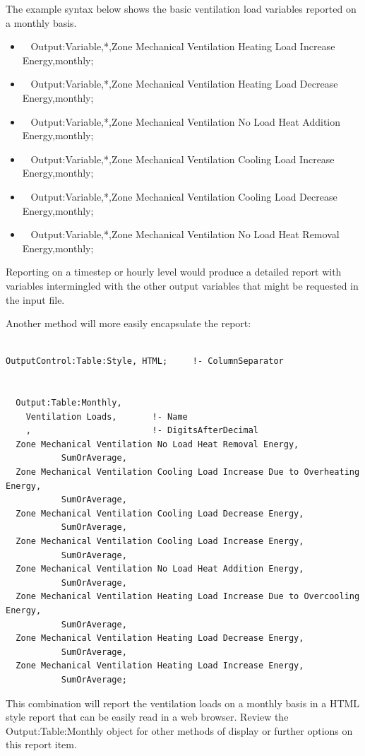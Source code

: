The example syntax below shows the basic ventilation load variables reported on a monthly basis.

\begin{itemize}
\item
  ~ Output:Variable,*,Zone Mechanical Ventilation Heating Load Increase Energy,monthly;
\item
  ~ Output:Variable,*,Zone Mechanical Ventilation Heating Load Decrease Energy,monthly;
\item
  ~ Output:Variable,*,Zone Mechanical Ventilation No Load Heat Addition Energy,monthly;
\item
  ~ Output:Variable,*,Zone Mechanical Ventilation Cooling Load Increase Energy,monthly;
\item
  ~ Output:Variable,*,Zone Mechanical Ventilation Cooling Load Decrease Energy,monthly;
\item
  ~ Output:Variable,*,Zone Mechanical Ventilation No Load Heat Removal Energy,monthly;
\end{itemize}

Reporting on a timestep or hourly level would produce a detailed report with variables intermingled with the other output variables that might be requested in the input file.

Another method will more easily encapsulate the report:

\begin{lstlisting}

OutputControl:Table:Style, HTML;     !- ColumnSeparator


  Output:Table:Monthly,
    Ventilation Loads,       !- Name
    ,                        !- DigitsAfterDecimal
  Zone Mechanical Ventilation No Load Heat Removal Energy,
           SumOrAverage,
  Zone Mechanical Ventilation Cooling Load Increase Due to Overheating Energy,
           SumOrAverage,
  Zone Mechanical Ventilation Cooling Load Decrease Energy,
           SumOrAverage,
  Zone Mechanical Ventilation Cooling Load Increase Energy,
           SumOrAverage,
  Zone Mechanical Ventilation No Load Heat Addition Energy,
           SumOrAverage,
  Zone Mechanical Ventilation Heating Load Increase Due to Overcooling Energy,
           SumOrAverage,
  Zone Mechanical Ventilation Heating Load Decrease Energy,
           SumOrAverage,
  Zone Mechanical Ventilation Heating Load Increase Energy,
           SumOrAverage;
\end{lstlisting}

This combination will report the ventilation loads on a monthly basis in a HTML style report that can be easily read in a web browser. Review the Output:Table:Monthly object for other methods of display or further options on this report item.


